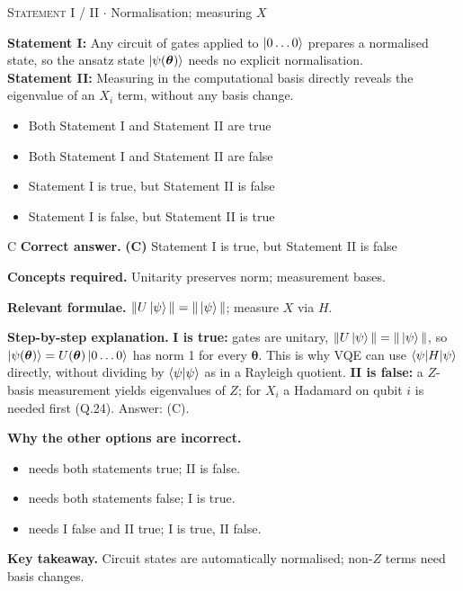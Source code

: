 \documentclass[11pt,a4paper]{article}
\newcommand{\optlabel}[1]{\textbf{(#1)}}
\newcommand{\correctlabel}[1]{\textcolor{okgreen}{\textbf{(#1)}\,\ding{51}}}
\newenvironment{qitem}[1]{\begin{list}{}{\setlength{\leftmargin}{3.3em}\setlength{\labelwidth}{3.1em}%
  \setlength{\labelsep}{0.2em}\setlength{\topsep}{3pt}\setlength{\parsep}{3pt}}\item[\textbf{Q.#1}\hfill]}{\end{list}}
\newcommand{\qsep}{\par\vspace{2pt}{\color{black!15}\hrule}\vspace{4pt}}
\newcommand{\qmeta}[2]{{\footnotesize\color{black!60}\textsc{#1} \;$\cdot$\; #2}\par}
\begin{document}
\begin{qitem}{28}
\qmeta{Statement I / II}{Normalisation; measuring $X$}
\textbf{Statement I:} Any circuit of gates applied to $\ket{0\dots0}$ prepares a normalised state, so the ansatz state $\ket{\psi(\boldsymbol\theta)}$ needs no
explicit normalisation.\\[1mm]
\textbf{Statement II:} Measuring in the computational basis directly reveals the eigenvalue of an $X_i$ term, without any basis change.
\begin{itemize}[leftmargin=2.6em, labelsep=0.4em, itemsep=2pt, topsep=3pt]
\item[\optlabel{A}] Both Statement I and Statement II are true
\item[\optlabel{B}] Both Statement I and Statement II are false
\item[\correctlabel{C}] Statement I is true, but Statement II is false
\item[\optlabel{D}] Statement I is false, but Statement II is true
\end{itemize}
\end{qitem}
\begin{solbox}{C}
\textbf{\color{brand}Correct answer.} \textcolor{okgreen}{\textbf{(C)}} Statement I is true, but Statement II is false

\textbf{\color{brand}Concepts required.} Unitarity preserves norm; measurement bases.

\textbf{\color{brand}Relevant formulae.} $\|U\ket\psi\| = \|\ket\psi\|$; measure $X$ via $H$.

\textbf{\color{brand}Step-by-step explanation.} \textbf{I is true:} gates are unitary, $\|U\ket\psi\| = \|\ket\psi\|$, so $\ket{\psi(\boldsymbol\theta)} = U(\boldsymbol\theta)\ket{0\dots0}$ has norm 1 for every $\boldsymbol\theta$. This is why
VQE can use $\braket{\psi|H|\psi}$ directly, without dividing by $\braket{\psi|\psi}$ as in a Rayleigh quotient.
\textbf{II is false:} a $Z$-basis measurement yields eigenvalues of $Z$; for $X_i$ a Hadamard on qubit $i$ is needed first (Q.24). Answer: (C).

\textbf{\color{brand}Why the other options are incorrect.}
\begin{itemize}[leftmargin=2.4em, itemsep=1pt, topsep=2pt]
\item[\textbf{(A)}] needs both statements true; II is false.
\item[\textbf{(B)}] needs both statements false; I is true.
\item[\textbf{(D)}] needs I false and II true; I is true, II false.
\end{itemize}
\textbf{\color{brand}Key takeaway.} Circuit states are automatically normalised; non-$Z$ terms need basis changes.
\end{solbox}
\qsep
\end{document}
